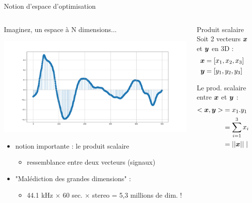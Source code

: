 \documentclass[9pt, aspectratio=169]{beamer}
\begin{document}
\begin{frame}{Notion d'espace d'optimisation} %
\begin{columns}
    \begin{column}{0.6\textwidth}
Imaginez, un espace à N dimensions...

\includegraphics[width=.9\textwidth]{fig/spacend_music.png}

\begin{itemize}
	\item notion importante : le produit scalaire
	\begin{itemize}
		\item ressemblance entre deux vecteurs (signaux)
	\end{itemize}
	\item "Malédiction des grandes dimensions" :
	\begin{itemize}
		\item 44.1 kHz $\times$ 60 sec. $\times$ stereo = 5,3 millions de dim. !
	\end{itemize}
\end{itemize}
	\end{column}
    \begin{column}{0.4\textwidth}
	
	\begin{myblockred}{Produit scalaire}
	Soit 2 vecteurs $\boldsymbol{x}$ et $\boldsymbol{y}$ en 3D :
	\begin{align*}
	\boldsymbol{x} &= [x_1, x_2, x_3]\\
	\boldsymbol{y} &= [y_1, y_2, y_3]
	\end{align*}
	
	Le prod. scalaire entre $\boldsymbol{x}$ et $\boldsymbol{y}$ :
	\begin{align*}
		<\boldsymbol{x}, \boldsymbol{y}> &= x_1.y_1 + x_2.y_2 + x_3.y_3 \\
				&= \sum\limits_{i=1}^3 x_i.y_i \\
				&= ||\boldsymbol{x}|| \ ||\boldsymbol{y}|| \ \cos(\widehat{\boldsymbol{x}, \boldsymbol{y}})
	\end{align*}
	\end{myblockred}
    \end{column}
\end{columns}

\end{frame}
\end{document}
